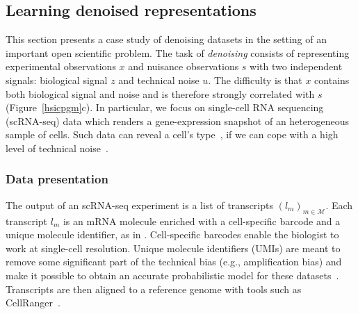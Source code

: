 \subsection{Learning denoised representations}
\label{hsicdenoise}
This section presents a case study of denoising datasets in the setting of an important open scientific problem. The task of \emph{denoising} consists of representing experimental observations $x$ and nuisance observations $s$ with two independent signals: biological signal $z$ and technical noise $u$. The difficulty is that $x$ contains both biological signal and noise and is therefore strongly correlated with $s$ (Figure~\ref{hsicpgm}c). In particular, we focus on single-cell RNA sequencing (scRNA-seq) data which renders a gene-expression snapshot of an heterogeneous sample of cells. Such data can reveal a cell's type~\cite{Wagner2016, Tanay2017}, if we can cope with a high level of technical noise~\cite{Grun2014}.


\subsubsection{Data presentation}
The output of an scRNA-seq experiment is a list of transcripts $(l_m)_{m \in \mathcal{M}}$. Each transcript $l_m$ is an mRNA molecule enriched with a cell-specific barcode and a unique molecule identifier, as in \cite{Klein2015}. Cell-specific barcodes enable the biologist to work at single-cell resolution. Unique molecule identifiers (UMIs) are meant to remove some significant part of the technical bias (e.g., amplification bias) and make it possible to obtain an accurate probabilistic model for these datasets~\cite{Lopez292037}. Transcripts are then aligned to a reference genome with tools such as CellRanger~\cite{Zheng2017}.

